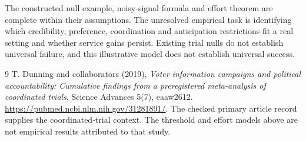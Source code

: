 \documentclass[11pt,a4paper]{article}
\begin{document}
The constructed null example, noisy-signal formula and effort theorem are complete within their assumptions. The unresolved empirical task is identifying which credibility, preference, coordination and anticipation restrictions fit a real setting and whether service gains persist. Existing trial nulls do not establish universal failure, and this illustrative model does not establish universal success.

\begin{thebibliography}{9}
 T. Dunning and collaborators (2019), \emph{Voter information campaigns and political accountability: Cumulative findings from a preregistered meta-analysis of coordinated trials}, Science Advances 5(7), eaaw2612. \url{https://pubmed.ncbi.nlm.nih.gov/31281891/}. The checked primary article record supplies the coordinated-trial context. The threshold and effort models above are not empirical results attributed to that study.
\end{thebibliography}
\end{document}
